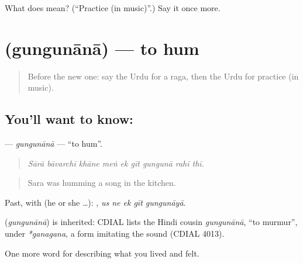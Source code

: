 \begin{tcolorbox}[breakable,colback=teal!4,colframe=teal!35!black,title={Before you move on}]
What does  mean? (\textquotedblleft{}Practice (in music)\textquotedblright{}.) Say it once more.
\end{tcolorbox}
\section[\texorpdfstring{\ur{گنگنانا} (gungunānā)}{گنگنانا (gungunānā)}]{ (gungunānā) — to hum}

\label{lesson:UR-C518-gungunana}



\begin{quote}
Before the new one: say the Urdu for a raga, then the Urdu for practice (in music).
\end{quote}

\subsection*{You'll want to know: }
\textbf{} — \emph{gungunānā} — \textquotedblleft{}to hum\textquotedblright{}.

\begin{quote}
        
\end{quote}

\begin{quote}
\emph{Sārā bāvarchī khāne meṅ ek gīt gungunā rahī thī.}
\end{quote}

\begin{quote}
Sara was humming a song in the kitchen.
\end{quote}

Past, with  (he or she …):     , \emph{us ne ek gīt gungunāyā}.

\begin{cousinweb}
\textbf{} (\emph{gungunānā}) is inherited: CDIAL lists the Hindi cousin \emph{gungunānā}, \textquotedblleft{}to murmur\textquotedblright{}, under \emph{*ganagana}, a form imitating the sound (CDIAL 4013).
\end{cousinweb}

\begin{grammarlens}[title={What you've built}]
One more word for describing what you lived and felt.
\end{grammarlens}

